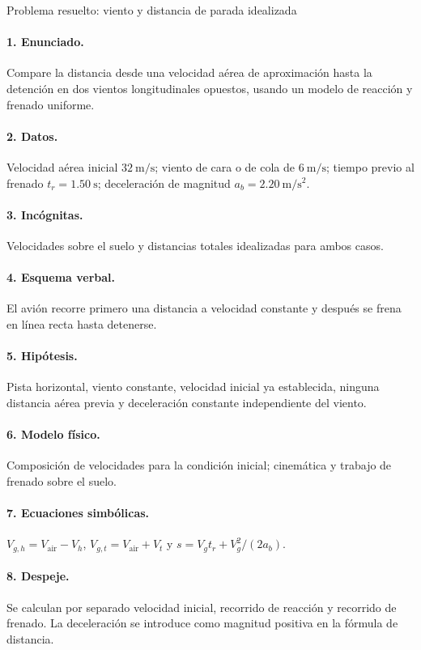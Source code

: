 \begin{studiumworked}{Problema resuelto: viento y distancia de parada idealizada}

\paragraph{1. Enunciado.} Compare la distancia desde una velocidad aérea de aproximación hasta la detención en dos vientos longitudinales opuestos, usando un modelo de reacción y frenado uniforme.
\paragraph{2. Datos.} Velocidad aérea inicial $32\ \mathrm{m/s}$; viento de cara o de cola de $6\ \mathrm{m/s}$; tiempo previo al frenado $t_r=1.50\ \mathrm s$; deceleración de magnitud $a_b=2.20\ \mathrm{m/s^2}$.
\paragraph{3. Incógnitas.} Velocidades sobre el suelo y distancias totales idealizadas para ambos casos.
\paragraph{4. Esquema verbal.} El avión recorre primero una distancia a velocidad constante y después se frena en línea recta hasta detenerse.
\paragraph{5. Hipótesis.} Pista horizontal, viento constante, velocidad inicial ya establecida, ninguna distancia aérea previa y deceleración constante independiente del viento.
\paragraph{6. Modelo físico.} Composición de velocidades para la condición inicial; cinemática y trabajo de frenado sobre el suelo.
\paragraph{7. Ecuaciones simbólicas.} $V_{g,h}=V_{\mathrm{air}}-V_h$, $V_{g,t}=V_{\mathrm{air}}+V_t$ y $s=V_gt_r+V_g^2/(2a_b)$.
\paragraph{8. Despeje.} Se calculan por separado velocidad inicial, recorrido de reacción y recorrido de frenado. La deceleración se introduce como magnitud positiva en la fórmula de distancia.

\end{studiumworked}

